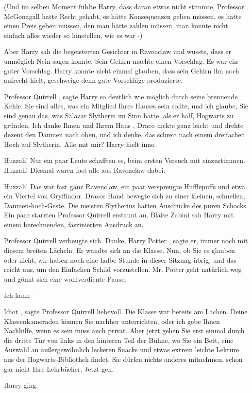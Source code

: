 (Und im selben Moment fühlte Harry, dass daran etwas nicht stimmte, Professor
McGonagall hatte Recht gehabt, es hätte Konsequenzen geben müssen, es hätte
einen Preis geben müssen, den man hätte zahlen müssen, man konnte nicht einfach
alles wieder so hinstellen, wie es war -)

Aber Harry sah die begeisterten Gesichter in Ravenclaw und wusste, dass er
unmöglich Nein sagen konnte. Sein Gehirn machte einen Vorschlag. Es war ein
guter Vorschlag. Harry konnte nicht einmal glauben, dass sein Gehirn ihn noch
aufrecht hielt, geschweige denn gute Vorschläge produzierte.

\glqq Professor Quirrell\grqq{} , sagte Harry so deutlich wie möglich durch
seine brennende Kehle. \glqq Sie sind alles, was ein Mitglied Ihres Hauses sein
sollte, und ich glaube, Sie sind genau das, was Salazar Slytherin im Sinn hatte,
als er half, Hogwarts zu gründen. Ich danke Ihnen und Ihrem Haus\grqq{} , Draco
nickte ganz leicht und drehte dezent den Daumen nach oben, \glqq und ich denke,
das schreit nach einem dreifachen Hoch auf Slytherin. Alle mit mir?\grqq{} Harry
hielt inne.

\glqq Huzzah!\grqq{} Nur ein paar Leute schafften es, beim ersten Versuch mit
einzustimmen. \glqq Huzzah!\grqq{} Diesmal waren fast alle aus Ravenclaw dabei.

\glqq Huzzah!\grqq{} Das war fast ganz Ravenclaw, ein paar versprengte
Hufflepuffs und etwa ein Viertel von Gryffindor. Dracos Hand bewegte sich zu
einer kleinen, schnellen, Daumen-hoch-Geste. Die meisten Slytherins hatten
Ausdrücke des puren Schocks. Ein paar starrten Professor Quirrell erstaunt an.
Blaise Zabini sah Harry mit einem berechnenden, faszinierten Ausdruck an.

Professor Quirrell verbeugte sich. \glqq Danke, Harry Potter\grqq{} , sagte er,
immer noch mit diesem breiten Lächeln. Er wandte sich an die Klasse. \glqq Nun,
ob Sie es glauben oder nicht, wir haben noch eine halbe Stunde in dieser Sitzung
übrig, und das reicht aus, um den Einfachen Schild vorzustellen. Mr. Potter geht
natürlich weg und gönnt sich eine wohlverdiente Pause.\grqq{}

\glqq Ich kann -\grqq{}

\glqq Idiot\grqq{} , sagte Professor Quirrell liebevoll. Die Klasse war bereits
am Lachen. \glqq Deine Klassenkameraden können Sie nachher unterrichten, oder
ich gebe Ihnen Nachhilfe, wenn es sein muss auch privat. Aber jetzt gehen Sie
erst einmal durch die dritte Tür von links in den hinteren Teil der Bühne, wo
Sie ein Bett, eine Auswahl an außergewöhnlich leckeren Snacks und etwas extrem
leichte Lektüre aus der Hogwarts-Bibliothek findet. Sie dürfen nichts anderes
mitnehmen, schon gar nicht Ihre Lehrbücher. Jetzt geh.\grqq{}

Harry ging.
